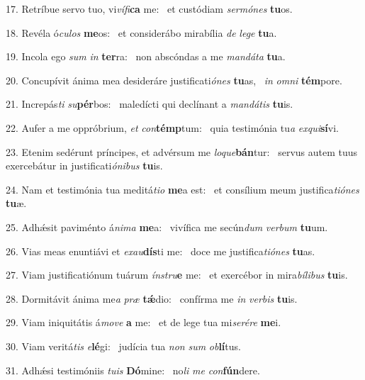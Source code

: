 17. Retríbue servo tuo, vi\textit{ví}\textit{fi}\textbf{ca} me: \ast\  et custódiam \textit{ser}\textit{mó}\textit{nes} \textbf{tu}os.\

18. Revéla ó\textit{cu}\textit{los} \textbf{me}os: \ast\  et considerábo mirabília \textit{de} \textit{le}\textit{ge} \textbf{tu}a.\

19. Incola ego \textit{sum} \textit{in} \textbf{ter}ra: \ast\  non abscóndas a me \textit{man}\textit{dá}\textit{ta} \textbf{tu}a.\

20. Concupívit ánima mea desideráre justificati\textit{ó}\textit{nes} \textbf{tu}as, \ast\  \textit{in} \textit{om}\textit{ni} \textbf{tém}pore.\

21. Increpás\textit{ti} \textit{su}\textbf{pér}bos: \ast\  maledícti qui declínant a \textit{man}\textit{dá}\textit{tis} \textbf{tu}is.\

22. Aufer a me oppróbrium, \textit{et} \textit{con}\textbf{témp}tum: \ast\  quia testimónia tu\textit{a} \textit{ex}\textit{qui}\textbf{sí}vi.\

23. Etenim sedérunt príncipes, et advérsum me \textit{lo}\textit{que}\textbf{bán}tur: \ast\  servus autem tuus exercebátur in justificati\textit{ó}\textit{ni}\textit{bus} \textbf{tu}is.\

24. Nam et testimónia tua meditá\textit{ti}\textit{o} \textbf{me}a est: \ast\  et consílium meum justifica\textit{ti}\textit{ó}\textit{nes} \textbf{tu}æ.\

25. Adhǽsit paviménto á\textit{ni}\textit{ma} \textbf{me}a: \ast\  vivífica me secún\textit{dum} \textit{ver}\textit{bum} \textbf{tu}um.\

26. Vias meas enuntiávi et \textit{ex}\textit{au}\textbf{dís}ti me: \ast\  doce me justifica\textit{ti}\textit{ó}\textit{nes} \textbf{tu}as.\

27. Viam justificatiónum tuárum \textit{ín}\textit{stru}\textbf{e} me: \ast\  et exercébor in mira\textit{bí}\textit{li}\textit{bus} \textbf{tu}is.\

28. Dormitávit ánima me\textit{a} \textit{præ} \textbf{tǽ}dio: \ast\  confírma me \textit{in} \textit{ver}\textit{bis} \textbf{tu}is.\

29. Viam iniquitátis á\textit{mo}\textit{ve} \textbf{a} me: \ast\  et de lege tua mi\textit{se}\textit{ré}\textit{re} \textbf{me}i.\

30. Viam veritá\textit{tis} \textit{e}\textbf{lé}gi: \ast\  judícia tua \textit{non} \textit{sum} \textit{ob}\textbf{lí}tus.\

31. Adhǽsi testimóniis \textit{tu}\textit{is} \textbf{Dó}mine: \ast\  no\textit{li} \textit{me} \textit{con}\textbf{fún}dere.\

